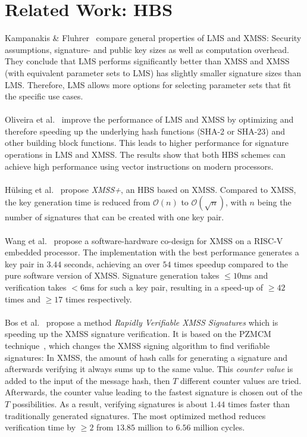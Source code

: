 \section{Related Work: HBS}
Kampanakis \& Fluhrer~\cite{comparison_xmss_lms_2017} compare general properties of LMS and XMSS: Security assumptions, signature- and public key sizes as well as computation overhead. They conclude that LMS performs significantly better than XMSS and XMSS (with equivalent parameter sets to LMS) has slightly smaller signature sizes than LMS. Therefore, LMS allows more options for selecting parameter sets that fit the specific use cases.
\\ \\
Oliveira et al.~\cite{perform_HBS_lms_xmss_2017} improve the performance of LMS and XMSS by optimizing and therefore speeding up the underlying hash functions (SHA-2 or SHA-23) and other building block functions. This leads to higher performance for signature operations in LMS and XMSS. The results show that both HBS schemes can achieve high performance using vector instructions on modern processors.
\\ \\
Hülsing et al.~\cite{xmss+_2018} propose \textit{XMSS+}, an HBS based on XMSS. Compared to XMSS, the key generation time is reduced from $\mathcal{O}(n)$ to $\mathcal{O}(\sqrt{n})$, with $n$ being the number of signatures that can be created with one key pair.
\\  \\
Wang et al.~\cite{xmss_embedded_systems_2020} propose a software-hardware co-design for XMSS on a RISC-V embedded processor. The implementation with the best performance generates a key pair in $3.44$ seconds, achieving an over $54$ times speedup compared to the pure software version of XMSS. Signature generation takes $\leq 10$ms and verification takes $< 6$ms for such a key pair, resulting in a speed-up of $\geq 42$ times and $\geq 17$ times respectively. 
\\ \\
Bos et al.~\cite{xmss_rapidly_verif_sign_2020} propose a method \textit{Rapidly Verifiable XMSS Signatures} which is speeding up the XMSS signature verification. It is based on the PZMCM technique~\cite{PZMCM_speedup_wots_2018}, which changes the XMSS signing algorithm to find verifiable signatures: In XMSS, the amount of hash calls for generating a signature and afterwards verifying it always sums up to the same value. This \textit{counter value} is added to the input of the message hash, then $T$ different counter values are tried. Afterwards, the counter value leading to the fastest signature is chosen out of the $T$ possibilities. As a result, verifying signatures is about $1.44$ times faster than traditionally generated signatures. The most optimized method reduces verification time by $\geq 2$ from $13.85$ million to $6.56$ million cycles.
